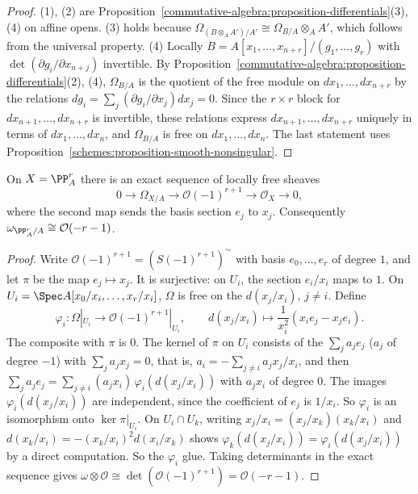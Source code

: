 \begin{proof}
(1), (2) are Proposition~\ref{commutative-algebra:proposition-differentials}(3), (4) on affine opens. (3) holds because
$\Omega_{(B \otimes_AA')/A'} \cong \Omega_{B/A} \otimes_AA'$, which follows from the universal property. (4) Locally
$B = A[x_1, \ldots, x_{n+r}]/(g_1, \ldots, g_r)$ with $\det(\partial g_i/\partial x_{n+j})$ invertible. By
Proposition~\ref{commutative-algebra:proposition-differentials}(2), (4), $\Omega_{B/A}$ is the quotient of the free module on $dx_1, \ldots, dx_{n+r}$ by the
relations $dg_i = \sum_j(\partial g_i/\partial x_j)dx_j = 0$. Since the $r \times r$ block for $dx_{n+1}, \ldots, dx_{n+r}$ is invertible, these relations express
$dx_{n+1}, \ldots, dx_{n+r}$ uniquely in terms of $dx_1, \ldots, dx_n$, and $\Omega_{B/A}$ is free on $dx_1, \ldots, dx_n$. The last statement uses
Proposition~\ref{schemes:proposition-smooth-nonsingular}.
\end{proof}

\begin{theorem}\label{schemes:theorem-euler-sequence}
On $X = \PP^r_A$ there is an exact sequence of locally free sheaves
\[
0 \to \Omega_{X/A} \to \mathcal{O}(-1)^{r+1} \to \mathcal{O}_X \to 0,
\]
where the second map sends the basis section $e_j$ to $x_j$. Consequently $\omega_{\PP^r_A/A} \cong \mathcal{O}(-r-1)$.
\end{theorem}

\begin{proof}
Write $\mathcal{O}(-1)^{r+1} = (S(-1)^{r+1})^\sim$ with basis $e_0, \ldots, e_r$ of degree $1$, and let $\pi$ be the map $e_j \mapsto x_j$. It is surjective: on $U_i$,
the section $e_i/x_i$ maps to $1$. On $U_i = \Spec A[x_0/x_i, \ldots, x_r/x_i]$, $\Omega$ is free on the $d(x_j/x_i)$, $j \neq i$. Define
\[
\varphi_i \colon \Omega|_{U_i} \to \mathcal{O}(-1)^{r+1}|_{U_i}, \qquad d(x_j/x_i) \mapsto \frac{1}{x_i^2}\left(x_ie_j - x_je_i\right) .
\]
The composite with $\pi$ is $0$. The kernel of $\pi$ on $U_i$ consists of the $\sum_ja_je_j$ ($a_j$ of degree $-1$) with $\sum_ja_jx_j = 0$, that is,
$a_i = -\sum_{j \neq i}a_jx_j/x_i$, and then $\sum_ja_je_j = \sum_{j \neq i}(a_jx_i)\,\varphi_i(d(x_j/x_i))$ with $a_jx_i$ of degree $0$. The images $\varphi_i(d(x_j/x_i))$
are independent, since the coefficient of $e_j$ is $1/x_i$. So $\varphi_i$ is an isomorphism onto $\ker\pi|_{U_i}$. On $U_i \cap U_k$, writing
$x_j/x_i = (x_j/x_k)(x_k/x_i)$ and $d(x_k/x_i) = -(x_k/x_i)^2d(x_i/x_k)$ shows $\varphi_k(d(x_j/x_i)) = \varphi_i(d(x_j/x_i))$ by a direct computation. So the $\varphi_i$
glue. Taking determinants in the exact sequence gives $\omega \otimes \mathcal{O} \cong \det(\mathcal{O}(-1)^{r+1}) = \mathcal{O}(-r-1)$.
\end{proof}

